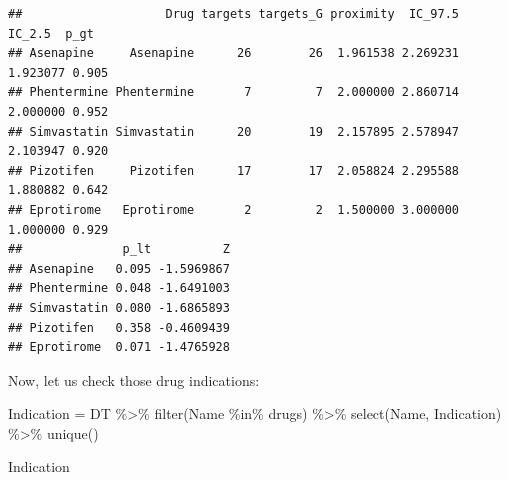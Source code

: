 \documentclass[
]{book}
\newenvironment{Shaded}{\begin{snugshade}}{\end{snugshade}}
\newcommand{\FunctionTok}[1]{\textcolor[rgb]{0.00,0.00,0.00}{#1}}
\newcommand{\NormalTok}[1]{#1}
\newcommand{\OtherTok}[1]{\textcolor[rgb]{0.56,0.35,0.01}{#1}}
\newcommand{\SpecialCharTok}[1]{\textcolor[rgb]{0.00,0.00,0.00}{#1}}
\begin{document}
\begin{verbatim}
##                    Drug targets targets_G proximity  IC_97.5   IC_2.5  p_gt
## Asenapine     Asenapine      26        26  1.961538 2.269231 1.923077 0.905
## Phentermine Phentermine       7         7  2.000000 2.860714 2.000000 0.952
## Simvastatin Simvastatin      20        19  2.157895 2.578947 2.103947 0.920
## Pizotifen     Pizotifen      17        17  2.058824 2.295588 1.880882 0.642
## Eprotirome   Eprotirome       2         2  1.500000 3.000000 1.000000 0.929
##              p_lt          Z
## Asenapine   0.095 -1.5969867
## Phentermine 0.048 -1.6491003
## Simvastatin 0.080 -1.6865893
## Pizotifen   0.358 -0.4609439
## Eprotirome  0.071 -1.4765928
\end{verbatim}

Now, let us check those drug indications:

\begin{Shaded}
\begin{Highlighting}[]
\NormalTok{Indication }\OtherTok{=}\NormalTok{ DT }\SpecialCharTok{\%\textgreater{}\%} 
  \FunctionTok{filter}\NormalTok{(Name }\SpecialCharTok{\%in\%}\NormalTok{ drugs) }\SpecialCharTok{\%\textgreater{}\%} 
  \FunctionTok{select}\NormalTok{(Name, Indication) }\SpecialCharTok{\%\textgreater{}\%} 
  \FunctionTok{unique}\NormalTok{()}

\NormalTok{Indication}
\end{Highlighting}
\end{Shaded}
\end{document}
